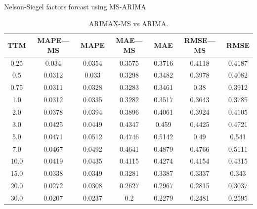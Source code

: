 \documentclass[aspectratio=169]{beamer}
\begin{document}
    \begin{frame}{Nelson-Siegel factors forcast using MS-ARIMA}
        \begin{table}[H]
            \begin{center}
                \begin{tabular}{|c|c|c|c|c|c|c|}
                    \hline
                    TTM    & MAPE---MS  & MAPE      & MAE---MS    & MAE       & RMSE---MS    & RMSE  \\ \hline
                    0.25   &0.034       & 0.0354    & 0.3575      & 0.3716    &0.4118        &0.4187 \\ \hline
                    0.5    &0.0312      & 0.033     & 0.3298      & 0.3482    &0.3978        &0.4082 \\ \hline
                    0.75   &0.0311      & 0.0328    & 0.3283      & 0.3461    &0.38          &0.3912   \\ \hline
                    1.0    &0.0312      & 0.0335    & 0.3282      & 0.3517    &0.3643        &0.3785 \\ \hline
                    2.0    &0.0378      & 0.0394    & 0.3896      & 0.4061    &0.3924        &0.4105 \\ \hline
                    3.0    &0.0425      & 0.0449    & 0.4347      & 0.459     &0.4425        &0.4721 \\ \hline
                    5.0    &0.0471      & 0.0512    & 0.4746      & 0.5142    &0.49          &0.541   \\ \hline
                    7.0    &0.0467      & 0.0492    & 0.4641      & 0.4879    &0.4766        &0.5111 \\ \hline
                    10.0   &0.0419      & 0.0435    & 0.4115      & 0.4274    &0.4154        &0.4315 \\ \hline
                    15.0   &0.0338      & 0.0349    & 0.3281      & 0.3387    &0.3337        &0.343 \\ \hline
                    20.0   &0.0272      & 0.0308    & 0.2627      & 0.2967    &0.2815        &0.3037 \\ \hline
                    30.0   &0.0207      & 0.0237    & 0.2         & 0.2279    &0.2481        &0.2595 \\ \hline
                \end{tabular}
                \caption{ARIMAX-MS vs ARIMA.}
            \end{center}
        \end{table} 
    \end{frame}
\end{document}
